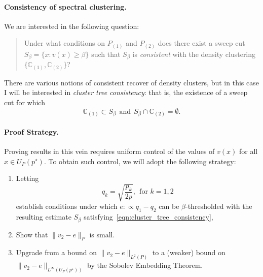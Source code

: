 \documentclass{article}
\newcommand{\1}{\mathbf{1}}
\newcommand{\Leb}{L}
\newcommand{\mb}[1]{\mathbb{#1}}
\theoremstyle{alden}
\theoremstyle{aldenthm}
\theoremstyle{definition}
\theoremstyle{remark}
\begin{document}
\paragraph{Consistency of spectral clustering.}
We are interested in the following question:
\begin{quote}
	Under what conditions on $P_{(1)}$ and $P_{(2)}$ does there exist a sweep cut $S_{\beta} = \{x: v(x) \geq \beta \}$ such that $S_{\beta}$ is \emph{consistent} with the density clustering $\{\mb{C}_{(1)}, \mb{C}_{(2)}\}$?
\end{quote} 
There are various notions of consistent recover of density clusters, but in this case I will be interested in \emph{cluster tree consistency}: that is, the existence of a sweep cut for which 
\begin{equation}
\label{eqn:cluster_tree_consistency}
\mb{C}_{(1)} \subset S_{\beta} ~~\textrm{and}~~ S_{\beta} \cap \mb{C}_{(2)} = \emptyset.
\end{equation}


\paragraph{Proof Strategy.}
Proving results in this vein requires uniform control of the values of $v(x)$ for all $x \in U_{P}(p^{\star})$. To obtain such control, we will adopt the following strategy:
\begin{enumerate}
	\item Letting
	\begin{equation}
	\label{eqn:square_root_likelihood}
	q_k = \sqrt{\frac{p_k}{2p}},~~\textrm{for $k = 1,2$}
	\end{equation}
	establish conditions under which $e :\propto q_1 - q_2$ can be $\beta$-thresholded with the resulting estimate $S_{\beta}$ satisfying~\eqref{eqn:cluster_tree_consistency},
	\item Show that $\|v_2 - e\|_{P}$ is small.
	\item Upgrade from a bound on $\|v_2 - e\|_{\Leb^2(P)}$ to a (weaker) bound on $\|v_2 - e\|_{\Leb^{\infty}(U_P(p^{\star}))}$ by the Sobolev Embedding Theorem.
\end{enumerate}
\end{document}
